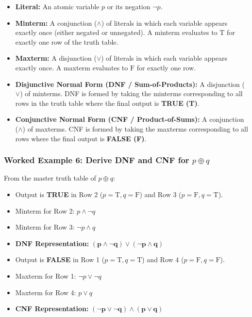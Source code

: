 \documentclass[11pt,a4paper]{article}
\begin{document}
\begin{definition}
\begin{itemize}[leftmargin=1.5em]
    \item \textbf{Literal:} An atomic variable $p$ or its negation $\neg p$.
    \item \textbf{Minterm:} A conjunction ($\land$) of literals in which each variable appears exactly once (either negated or unnegated). A minterm evaluates to $\text{T}$ for exactly one row of the truth table.
    \item \textbf{Maxterm:} A disjunction ($\lor$) of literals in which each variable appears exactly once. A maxterm evaluates to $\text{F}$ for exactly one row.
    \item \textbf{Disjunctive Normal Form (DNF / Sum-of-Products):} A disjunction ($\lor$) of minterms. DNF is formed by taking the minterms corresponding to all rows in the truth table where the final output is \textbf{TRUE (T)}.
    \item \textbf{Conjunctive Normal Form (CNF / Product-of-Sums):} A conjunction ($\land$) of maxterms. CNF is formed by taking the maxterms corresponding to all rows where the final output is \textbf{FALSE (F)}.
\end{itemize}
\end{definition}

\subsubsection*{Worked Example 6: Derive DNF and CNF for $p \oplus q$}

From the master truth table of $p \oplus q$:
\begin{itemize}[leftmargin=1.5em]
    \item Output is \textbf{TRUE} in Row 2 ($p=\text{T}, q=\text{F}$) and Row 3 ($p=\text{F}, q=\text{T}$).
    \item Minterm for Row 2: $p \land \neg q$
    \item Minterm for Row 3: $\neg p \land q$
    \item \textbf{DNF Representation:} $\mathbf{(p \land \neg q) \lor (\neg p \land q)}$
    \item Output is \textbf{FALSE} in Row 1 ($p=\text{T}, q=\text{T}$) and Row 4 ($p=\text{F}, q=\text{F}$).
    \item Maxterm for Row 1: $\neg p \lor \neg q$
    \item Maxterm for Row 4: $p \lor q$
    \item \textbf{CNF Representation:} $\mathbf{(\neg p \lor \neg q) \land (p \lor q)}$
\end{itemize}
\end{document}
